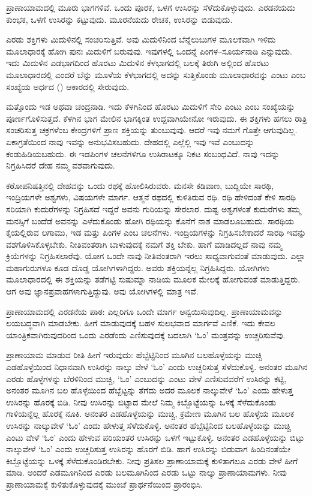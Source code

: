 ಪ್ರಾಣಾಯಾಮದಲ್ಲಿ ಮೂರು ಭಾಗಗಳಿವೆ. ಒಂದು ಪೂರಕ, ಒಳಗೆ ಉಸಿರನ್ನು ಸೆಳೆದುಕೊಳ್ಳುವುದು. ಎರಡನೆಯದು ಕುಂಭಕ, ಒಳಗೆ ಉಸಿರನ್ನು ಕಟ್ಟುವುದು. ಮೂರನೆಯದು ರೇಚಕ, ಉಸಿರನ್ನು ಬಿಡುವುದು.

ಎರಡು ಶಕ್ತಿಗಳು ಮಿದುಳಿನಲ್ಲಿ ಸಂಚರಿಸುತ್ತಿವೆ. ಅವು ಮಿದುಳಿನಿಂದ ಬೆನ್ನೆಲುಬುಗಳ ಮೂಲಕವಾಗಿ ಇಳಿದು ಮೂಲಾಧಾರಕ್ಕೆ ಹೋಗಿ ಪುನಃ ಮಿದುಳಿಗೆ ಬರುವುವು. ಇವುಗಳಲ್ಲಿ ಒಂದನ್ನೆ ಪಿಂಗಳ–ಸೂರ್ಯನಾಡಿ ಎನ್ನುವುದು. ಇದು ಮಿದುಳಿನ ಎಡಭಾಗದಿಂದ ಹೊರಟು ಮಿದುಳಿನ ಕೆಳಭಾಗದಲ್ಲಿ ಬಲಕ್ಕೆ ತಿರುಗಿ ಅಲ್ಲಿಂದ ಹೊರಟು ಮೂಲಾಧಾರದಲ್ಲಿ ಎಂದರೆ ಬೆನ್ನು ಮೂಳೆಯ ಕೆಳಭಾಗದಲ್ಲಿ ಅದನ್ನು ಸುತ್ತಿಕೊಂಡು ಮೂಲಾಧಾರವನ್ನು ಎಂಟು ಎಂಬ ಸಂಖ್ಯೆಯ ಅರ್ಧದ () ಆಕಾರದಲ್ಲಿ ಸೇರುವುದು.

ಮತ್ತೊಂದು ಇಡ ಅಥವಾ ಚಂದ್ರನಾಡಿ. ಇದು ಕೆಳಗಿನಿಂದ ಹೊರಟು ಮಿದುಳಿಗೆ ಸೇರಿ ಎಂಟು ಎಂಬ ಸಂಖ್ಯೆಯನ್ನು ಪೂರ್ಣಗೊಳಿಸುತ್ತದೆ. ಕೆಳಗಿನ ಭಾಗ ಮೇಲಿನ ಭಾಗಕ್ಕಿಂತ ಉದ್ದವಾಗಿಯೇನೋ ಇರುವುದು. ಈ ಶಕ್ತಿಗಳು ಹಗಲು ರಾತ್ರಿ ಸಂಚರಿಸುತ್ತ ಚಕ್ರಗಳೆಂಬ ಕೇಂದ್ರಗಳಿಗೆ ಪ್ರಾಣ ಶಕ್ತಿಯನ್ನು ತುಂಬುವುವು. ಆದರೆ ಇವು ನಮಗೆ ಗೊತ್ತೇ ಆಗುವುದಿಲ್ಲ. ಏಕಾಗ್ರತೆಯಿಂದ ನಾವು ಇವನ್ನು ಅನುಭವಿಸಬಹುದು. ದೇಹದಲ್ಲಿ ಎಲ್ಲೆಲ್ಲಿ ಇವು ಇವೆ ಎಂಬುದನ್ನು ಕಂಡುಹಿಡಿಯಬಹುದು. ಈ ಇಡಪಿಂಗಳ ಚಲನೆಗಳಿಗೂ ಉಸಿರಾಟಕ್ಕೂ ನಿಕಟ ಸಂಬಂಧವಿದೆ. ನಾವು ಇದನ್ನು ನಿಗ್ರಹಿಸಿದರೆ ದೇಹ ನಮ್ಮ ವಶವಾಗುವುದು.

ಕಠೋಪನಿಷತ್ತಿನಲ್ಲಿ ದೇಹವನ್ನು ಒಂದು ರಥಕ್ಕೆ ಹೋಲಿಸಿರುವರು. ಮನಸೇ ಕಡಿವಾಣ, ಬುದ್ದಿಯೇ ಸಾರಥಿ, ಇಂದ್ರಿಯಗಳೇ ಅಶ್ವಗಳು, ವಿಷಯಗಳೇ ಮಾರ್ಗ. ಆತ್ಮನೆ ರಥದಲ್ಲಿ ಕುಳಿತಿರುವ ರಥಿ. ರಥಿ ಹೇಳಿದಂತೆ ಕೇಳಿ ಸಾರಥಿ ಸರಿಯಾಗಿ ಕುದುರೆಗಳನ್ನು ನಿಗ್ರಹಿಸದೆ ಇದ್ದರೆ ಅವನು ಗುರಿಯನ್ನು ಸೇರಲಾರ. ದುಷ್ಟ ಅಶ್ವಗಳಂತೆ ಕುದುರೆಗಳು ತಮ್ಮ ಮನಸ್ಸಿಗೆ ಬಂದೆಡೆ ಅವನನ್ನು ಎಳೆದುಕೊಂಡು ಹೋಗಿ ರಥಿಯನ್ನು ಕೊನೆಗೆ ನಾಶ ಮಾಡಲೂಬಹುದು. ಸಾರಥಿಯ ಕೈಯಲ್ಲಿರುವ ಲಗಾಮು, ಇಡ ಮತ್ತು ಪಿಂಗಳ ಎಂಬ ಚಲನೆಗಳು. ಇಂದ್ರಿಯಗಳನ್ನು ನಿಗ್ರಹಿಸಬೇಕಾದರೆ ಸಾರಥಿ ಇವನ್ನು ವಶಗೊಳಿಸಿಕೊಳ್ಳಬೇಕು. ನೀತಿವಂತರಾಗಿ ಬಾಳುವುದಕ್ಕೆ ನಮಗೆ ಶಕ್ತಿ ಬೇಕು. ಹಾಗೆ ಮಾಡಿದಲ್ಲದೆ ನಾವು ನಮ್ಮ ಕ್ರಿಯೆಗಳನ್ನು ನಿಗ್ರಹಿಸಲಾರೆವು. ಯೋಗ ಒಂದೇ ನಾವು ನೀತಿವಂತರಾಗಿ ಇರಲು ಸಾಧ್ಯವಾಗುವಂತೆ ಮಾಡುವುದು. ಎಲ್ಲಾ ಮಹಾಗುರುಗಳೂ ಕೂಡ ದೊಡ್ಡ ಯೋಗಿಗಳಾಗಿದ್ದರು. ಅವರು ಶಕ್ತಿಯನ್ನೆಲ್ಲ ನಿಗ್ರಹಿಸಿದ್ದರು. ಯೋಗಿಗಳು ಮೂಲಾಧಾರದಲ್ಲಿ ಈ ಶಕ್ತಿಯನ್ನು ತಡೆಗಟ್ಟಿ ಸುಷುಮ್ನಾ ನಾಡಿಯ ಮೂಲಕ ಮೇಲಕ್ಕೆ ಹೋಗುವಂತೆ ಮಾಡುತ್ತಿದ್ದರು. ಆಗ ಅವು ಜ್ಞಾನಪ್ರವಾಹಗಳಾಗುತ್ತಿದ್ದುವು. ಅವು ಯೋಗಿಗಳಲ್ಲಿ ಮಾತ್ರ ಇವೆ.

ಪ್ರಾಣಾಯಾಮದಲ್ಲಿ ಎರಡನೆಯ ಪಾಠ: ಎಲ್ಲರಿಗೂ ಒಂದೇ ಮಾರ್ಗ ಅನ್ವಯಿಸುವುದಿಲ್ಲ. ಪ್ರಾಣಾಯಾಮವನ್ನು ಲಯಬದ್ಧವಾಗಿ ಮಾಡಬೇಕು. ಹೀಗೆ ಮಾಡುವುದಕ್ಕೆ ಬಹಳ ಸುಲಭವಾದ ಮಾರ್ಗವೆ ಎಣಿಕೆ. ಇದು ಕೇವಲ ಯಾಂತ್ರಿಕವಾಗಿರುವುದರಿಂದ ಒಂದು ಎರಡೆಂದು ಎಣಿಸುವುದಕ್ಕೆ ಬದಲಾಗಿ `ಓಂ' ಮಂತ್ರವನ್ನು ಉಚ್ಚರಿಸುವೆವು.

ಪ್ರಾಣಾಯಾಮ ಮಾಡುವ ರೀತಿ ಹೀಗೆ ಇರುವುದು: ಹೆಬ್ಬೆಟ್ಟಿನಿಂದ ಮೂಗಿನ ಬಲಹೊಳ್ಳೆಯನ್ನು ಮುಚ್ಚಿ ಎಡಹೊಳ್ಳೆಯಿಂದ ನಿಧಾನವಾಗಿ ಉಸಿರನ್ನು ನಾಲ್ಕು ವೇಳೆ `ಓಂ' ಎಂದು ಉಚ್ಚರಿಸುತ್ತ ಸೆಳೆದುಕೊಳ್ಳಿ. ಅನಂತರ ಮೂಗಿನ ಎರಡು ಹೊಳ್ಳೆಗಳನ್ನು ಬೆರಳಿನಿಂದ ಮುಚ್ಚಿ, `ಓಂ' ಎಂಬುದನ್ನು ಎಂಟು ವೇಳೆ ಎಣಿಸುವವರೆಗೆ ಉಸಿರನ್ನು ಕಟ್ಟಿ, ಅನಂತರ ಮೂಗಿನ ಬಲ ಹೊಳ್ಳೆಯಿಂದ ಹೆಬ್ಬೆಟ್ಟನ್ನು ತೆಗೆದು ಅದರ ಮೂಲಕ ನಾಲ್ಕುವೇಳೆ `ಓಂ' ಎಂದು ಹೇಳುತ್ತ ಉಸಿರನ್ನು ಹೊರಕ್ಕೆ ಬಿಡಿ. ನೀವು ಉಸಿರನ್ನು ಬಿಟ್ಟಾದ ಮೇಲೆ ನಿಮ್ಮ ಕಿಬ್ಬೊಟ್ಟೆಯನ್ನು ಒಳಕ್ಕೆ ಸೆಳೆದುಕೊಂಡು ಗಾಳಿಯನ್ನೆಲ್ಲ ಹೊರಕ್ಕೆ ನೂಕಿ. ಅನಂತರ ಎಡಹೊಳ್ಳೆಯನ್ನು ಮುಚ್ಚಿ, ಕ್ರಮೇಣ ಮೂಗಿನ ಬಲ ಹೊಳ್ಳೆಯ ಮೂಲಕ ಉಸಿರನ್ನು ನಾಲ್ಕುವೇಳೆ `ಓಂ' ಎಂದು ಹೇಳುತ್ತ ಸೆಳೆದುಕೊಳ್ಳಿ. ಅನಂತರ ಹೆಬ್ಬೆಟ್ಟಿನಿಂದ ಬಲಹೊಳ್ಳೆಯನ್ನು ಮುಚ್ಚಿ ಎಂಟು ವೇಳೆ `ಓಂ' ಎಂದು ಹೇಳುವ ಪರಿಯಂತರ ಉಸಿರನ್ನು ಒಳಗೆ ಇಟ್ಟುಕೊಳ್ಳಿ. ಅನಂತರ ಎಡಹೊಳ್ಳೆಯನ್ನು ಬಿಟ್ಟು ನಾಲ್ಕುವೇಳೆ `ಓಂ' ಎಂದು ಉಚ್ಚರಿಸುತ್ತ ಉಸಿರನ್ನು ಹೊರಗೆ ಬಿಡಿ. ಹಾಗೆ ಉಸಿರನ್ನು ಬಿಡುವಾಗ ಹಿಂದಿನಂತೆಯೇ ಕಿಬ್ಬೊಟ್ಟೆಯನ್ನು ಒಳಕ್ಕೆ ಸೆಳೆದುಕೊಂಡಿರಬೇಕು. ನೀವು ಪ್ರತಿಸಲ ಪ್ರಾಣಾಯಾಮಕ್ಕೆ ಕುಳಿತಾಗಲೂ ಎರಡು ವೇಳೆ ಹೀಗೆ ಮಾಡಿ. ಅಂದರೆ ಎಡಮೂಗಿನಿಂದ ಎರಡು ಬಲಮೂಗಿನಿಂದ ಎರಡು ಒಟ್ಟು ನಾಲ್ಕು ಪ್ರಾಣಾಯಾಮಗಳು. ನೀವು ಪ್ರಾಣಾಯಾಮಕ್ಕೆ ಕುಳಿತುಕೊಳ್ಳುವುದಕ್ಕೆ ಮುಂಚೆ ಪ್ರಾರ್ಥನೆಯಿಂದ ಪ್ರಾರಂಭಿಸಿ.

